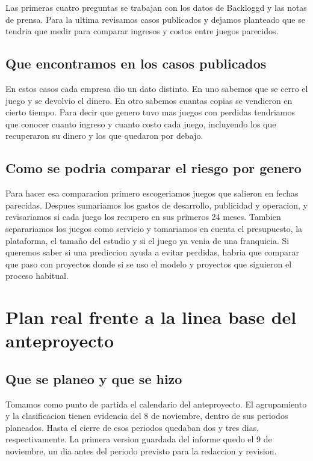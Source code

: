 Las primeras cuatro preguntas se trabajan con los datos de Backloggd y las notas de prensa. Para la ultima revisamos casos publicados y dejamos planteado que se tendria que medir para comparar ingresos y costos entre juegos parecidos.

\subsection{Que encontramos en los casos publicados}
\CasosComerciales

En estos casos cada empresa dio un dato distinto. En uno sabemos que se cerro el juego y se devolvio el dinero. En otro sabemos cuantas copias se vendieron en cierto tiempo. Para decir que genero tuvo mas juegos con perdidas tendriamos que conocer cuanto ingreso y cuanto costo cada juego, incluyendo los que recuperaron su dinero y los que quedaron por debajo.

\subsection{Como se podria comparar el riesgo por genero}
Para hacer esa comparacion primero escogeriamos juegos que salieron en fechas parecidas. Despues sumariamos los gastos de desarrollo, publicidad y operacion, y revisariamos si cada juego los recupero en sus primeros 24 meses. Tambien separariamos los juegos como servicio y tomariamos en cuenta el presupuesto, la plataforma, el tamaño del estudio y si el juego ya venia de una franquicia. Si queremos saber si una prediccion ayuda a evitar perdidas, habria que comparar que paso con proyectos donde si se uso el modelo y proyectos que siguieron el proceso habitual.

\section{Plan real frente a la linea base del anteproyecto}
\subsection{Que se planeo y que se hizo}
Tomamos como punto de partida el calendario del anteproyecto. El agrupamiento y la clasificacion tienen evidencia del 8 de noviembre, dentro de sus periodos planeados. Hasta el cierre de esos periodos quedaban dos y tres dias, respectivamente. La primera version guardada del informe quedo el 9 de noviembre, un dia antes del periodo previsto para la redaccion y revision.

